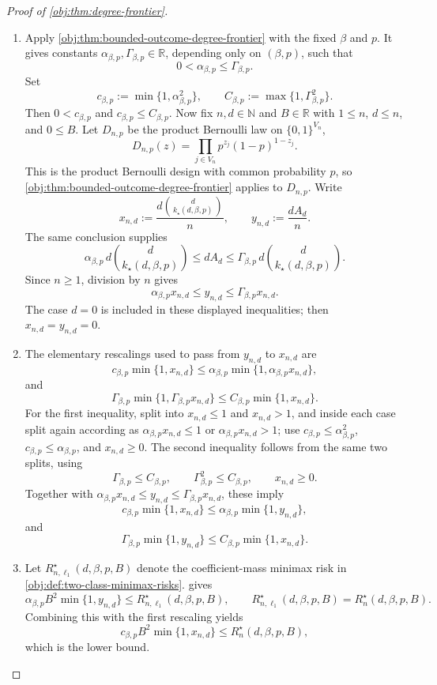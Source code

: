 \begin{proof}[Proof of \cref{obj:thm:degree-frontier}]
\begin{enumerate}
\item
Apply \cref{obj:thm:bounded-outcome-degree-frontier} with the fixed \(\beta\) and \(p\).  It gives constants
\(\alpha_{\beta,p},\Gamma_{\beta,p}\in\mathbb R\), depending only on \((\beta,p)\), such that
\[
0<\alpha_{\beta,p}\le \Gamma_{\beta,p}.
\]
Set
\[
c_{\beta,p}:=\min\{1,\alpha_{\beta,p}^{2}\},
\qquad
C_{\beta,p}:=\max\{1,\Gamma_{\beta,p}^{2}\}.
\]
Then \(0<c_{\beta,p}\) and \(c_{\beta,p}\le C_{\beta,p}\).  Now fix \(n,d\in\mathbb N\) and \(B\in\mathbb R\) with \(1\le n\), \(d\le n\), and \(0\le B\).  Let \(D_{n,p}\) be the product Bernoulli law on \(\{0,1\}^{V_n}\),
\[
D_{n,p}(z)=\prod_{j\in V_n}p^{z_j}(1-p)^{1-z_j}.
\]
This is the product Bernoulli design with common probability \(p\), so \cref{obj:thm:bounded-outcome-degree-frontier} applies to \(D_{n,p}\).  Write
\[
x_{n,d}:=\frac{d\binom{d}{k_\star(d,\beta,p)}}{n},
\qquad
y_{n,d}:=\frac{dA_d}{n}.
\]
The same conclusion supplies
\[
\alpha_{\beta,p}\,d\binom{d}{k_\star(d,\beta,p)}
\le dA_d
\le
\Gamma_{\beta,p}\,d\binom{d}{k_\star(d,\beta,p)}.
\]
Since \(n\ge1\), division by \(n\) gives
\[
\alpha_{\beta,p}x_{n,d}\le y_{n,d}\le \Gamma_{\beta,p}x_{n,d}.
\]
The case \(d=0\) is included in these displayed inequalities; then \(x_{n,d}=y_{n,d}=0\). %

\item
The elementary rescalings used to pass from \(y_{n,d}\) to \(x_{n,d}\) are
\[
c_{\beta,p}\min\{1,x_{n,d}\}
\le
\alpha_{\beta,p}\min\{1,\alpha_{\beta,p}x_{n,d}\},
\]
and
\[
\Gamma_{\beta,p}\min\{1,\Gamma_{\beta,p}x_{n,d}\}
\le
C_{\beta,p}\min\{1,x_{n,d}\}.
\]
For the first inequality, split into \(x_{n,d}\le1\) and \(x_{n,d}>1\), and inside each case split again according as \(\alpha_{\beta,p}x_{n,d}\le1\) or \(\alpha_{\beta,p}x_{n,d}>1\); use \(c_{\beta,p}\le\alpha_{\beta,p}^{2}\), \(c_{\beta,p}\le\alpha_{\beta,p}\), and \(x_{n,d}\ge0\).  The second inequality follows from the same two splits, using
\[
\Gamma_{\beta,p}\le C_{\beta,p},
\qquad
\Gamma_{\beta,p}^{2}\le C_{\beta,p},
\qquad
x_{n,d}\ge0.
\]
Together with \(\alpha_{\beta,p}x_{n,d}\le y_{n,d}\le \Gamma_{\beta,p}x_{n,d}\), these imply
\[
c_{\beta,p}\min\{1,x_{n,d}\}
\le
\alpha_{\beta,p}\min\{1,y_{n,d}\},
\]
and
\[
\Gamma_{\beta,p}\min\{1,y_{n,d}\}
\le
C_{\beta,p}\min\{1,x_{n,d}\}.
\] %

\item
Let \(R_{n,\ell_1}^{\star}(d,\beta,p,B)\) denote the coefficient-mass minimax risk in \cref{obj:def:two-class-minimax-risks}.   gives
\[
\alpha_{\beta,p}B^2\min\{1,y_{n,d}\}
\le
R_{n,\ell_1}^{\star}(d,\beta,p,B),
\qquad
R_{n,\ell_1}^{\star}(d,\beta,p,B)=R_n^\star(d,\beta,p,B).
\]
Combining this with the first rescaling yields
\[
c_{\beta,p}B^2\min\{1,x_{n,d}\}
\le
R_n^\star(d,\beta,p,B),
\]
which is the lower bound. %


\end{enumerate}
\end{proof}

